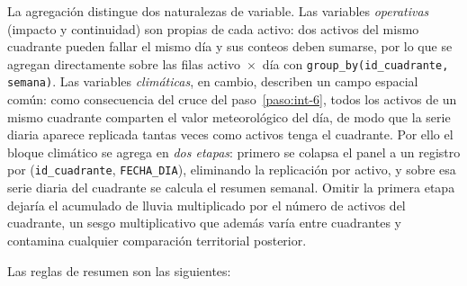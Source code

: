     La agregación distingue dos naturalezas de variable. Las variables \textit{operativas} (impacto y continuidad) son propias de cada activo: dos activos del mismo cuadrante pueden fallar el mismo día y sus conteos deben sumarse, por lo que se agregan directamente sobre las filas activo~$\times$~día con \texttt{group\_by(id\_cuadrante, semana)}. Las variables \textit{climáticas}, en cambio, describen un campo espacial común: como consecuencia del cruce del paso~\ref{paso:int-6}, todos los activos de un mismo cuadrante comparten el valor meteorológico del día, de modo que la serie diaria aparece replicada tantas veces como activos tenga el cuadrante. Por ello el bloque climático se agrega en \textit{dos etapas}: primero se colapsa el panel a un registro por (\texttt{id\_cuadrante}, \texttt{FECHA\_DIA}), eliminando la replicación por activo, y sobre esa serie diaria del cuadrante se calcula el resumen semanal. Omitir la primera etapa dejaría el acumulado de lluvia multiplicado por el número de activos del cuadrante, un sesgo multiplicativo que además varía entre cuadrantes y contamina cualquier comparación territorial posterior.

    Las reglas de resumen son las siguientes:
    
